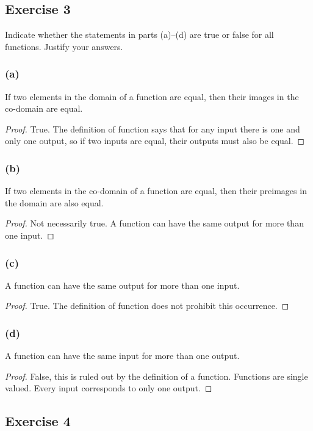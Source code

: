 \documentclass[14pt]{extarticle}
\begin{document}
\subsection{Exercise 3}
Indicate whether the statements in parts (a)–(d) are true or false for all functions. Justify your answers.

\subsubsection{(a)}
If two elements in the domain of a function are equal, then their images in the co-domain are equal.

\begin{proof}
True. The definition of function says that for any input there is one and only one output, so if two inputs are 
equal, their outputs must also be equal.
\end{proof}

\subsubsection{(b)}
If two elements in the co-domain of a function are equal, then their preimages in the domain are also equal.

\begin{proof}
Not necessarily true. A function can have the same output for more than one input.
\end{proof}

\subsubsection{(c)}
A function can have the same output for more than one input.

\begin{proof}
True. The definition of function does not prohibit this occurrence.
\end{proof}

\subsubsection{(d)}
A function can have the same input for more than one output.

\begin{proof}
False, this is ruled out by the definition of a function. Functions are single valued. Every input corresponds to 
only one output.
\end{proof}

\subsection{Exercise 4}
\end{document}
